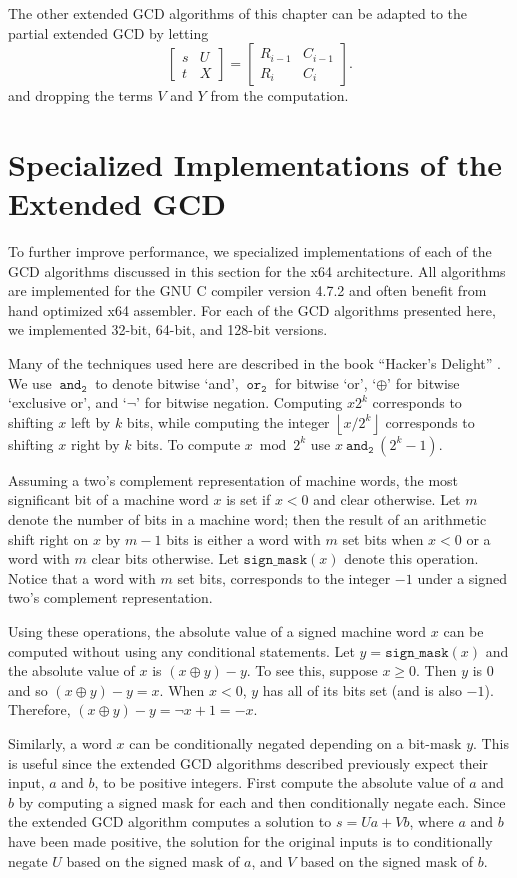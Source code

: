 \documentclass{ucalgthes1}
\theoremstyle{definition}
\newcommand{\matrixtt}[4]{\left[ \begin{array}{rr} #1 & #2 \\ #3 & #4 \end{array} \right]}
\newcommand{\floor}[1]{\left\lfloor #1 \right\rfloor}
\newcommand{\band}{~\texttt{and}_\texttt{2}~}
\newcommand{\bor}{~\texttt{or}_\texttt{2}~}
\newcommand{\bxor}{\oplus}
\newcommand{\bnot}{\lnot}
\newcommand{\compiler}{GNU C compiler version 4.7.2}
\begin{document}
The other extended GCD algorithms of this chapter can be adapted to the partial extended GCD by letting
\[
	\matrixtt{s}{U}{t}{X} = \matrixtt{R_{i-1}}{C_{i-1}}{R_i}{C_i}.
\]
and dropping the terms $V$ and $Y$ from the computation.


\section{Specialized Implementations of the Extended GCD}
\label{sec:gcdImpl}

To further improve performance, we specialized implementations of each of the GCD algorithms discussed in this section for the x64 architecture.  All algorithms are implemented for the \compiler{} and often benefit from hand optimized x64 assembler.  For each of the GCD algorithms presented here, we implemented 32-bit, 64-bit, and 128-bit versions.

Many of the techniques used here are described in the book ``Hacker's Delight'' \cite{Warren2002}.  We use $\band$ to denote bitwise `and', $\bor$ for bitwise `or', `$\bxor$' for bitwise `exclusive or', and `$\bnot$' for bitwise negation.  Computing $x2^k$ corresponds to shifting $x$ left by $k$ bits, while computing the integer $\floor{x / 2^k}$ corresponds to shifting $x$ right by $k$ bits.  To compute $x \bmod 2^k$ use $x \band (2^k-1)$.

Assuming a two's complement representation of machine words, the most significant bit of a machine word $x$ is set if $x < 0$ and clear otherwise.  Let $m$ denote the number of bits in a machine word; then the result of an arithmetic shift right on $x$ by $m-1$ bits is either a word with $m$ set bits when $x < 0$ or a word with $m$ clear bits otherwise.  Let $\texttt{sign\_mask}(x)$ denote this operation.  Notice that a word with $m$ set bits, corresponds to the integer $-1$ under a signed two's complement representation.

Using these operations, the absolute value of a signed machine word $x$ can be computed without using any conditional statements.  Let $y = \texttt{sign\_mask}(x)$ and the absolute value of $x$ is $(x \bxor y) - y$.  To see this, suppose $x \ge 0$.  Then $y$ is 0 and so $(x \bxor y) - y = x$.  When $x < 0$, $y$ has all of its bits set (and is also $-1$).  Therefore, $(x \bxor y) - y = \bnot x + 1 = -x$.

Similarly, a word $x$ can be conditionally negated depending on a bit-mask $y$.  This is useful since the extended GCD algorithms described previously expect their input, $a$ and $b$, to be positive integers.  First compute the absolute value of $a$ and $b$ by computing a signed mask for each and then conditionally negate each.  Since the extended GCD algorithm computes a solution to $s = Ua + Vb$, where $a$ and $b$ have been made positive, the solution for the original inputs is to conditionally negate $U$ based on the signed mask of $a$, and $V$ based on the signed mask of $b$.
\end{document}
